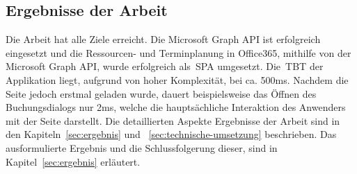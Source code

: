     \subsection{Ergebnisse der Arbeit}\label{subsec:ergebnisse-der-arbeit}
Die Arbeit hat alle Ziele erreicht.
    Die Microsoft Graph API ist erfolgreich eingesetzt und die Ressourcen- und Terminplanung in Office365, mithilfe von der Microsoft Graph API, wurde erfolgreich als~\gls{SPA} umgesetzt.
Die~\gls{TBT} der Applikation liegt, aufgrund von hoher Komplexität, bei ca. 500ms.
    Nachdem die Seite jedoch erstmal geladen wurde, dauert beispielsweise das Öffnen des Buchungsdialogs nur 2ms, welche die hauptsächliche Interaktion des Anwenders mit der Seite darstellt.
    \newline
Die detaillierten Aspekte Ergebnisse der Arbeit sind in den Kapiteln~\ref{sec:ergebnis} und ~\ref{sec:technische-umsetzung} beschrieben.
Das ausformulierte Ergebnis und die Schlussfolgerung dieser, sind in Kapitel~\ref{sec:ergebnis} erläutert.
\newpage

